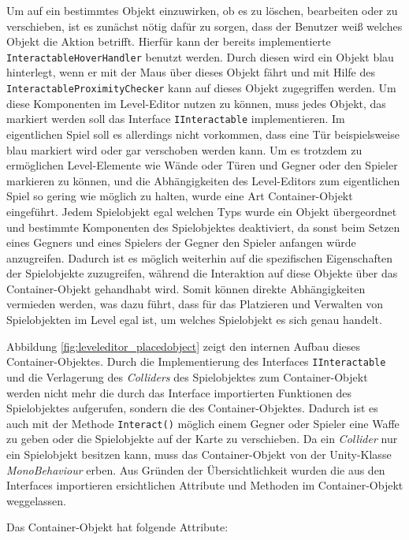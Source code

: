 Um auf ein bestimmtes Objekt einzuwirken, ob es zu löschen, bearbeiten oder zu verschieben, ist es zunächst nötig dafür zu sorgen, dass der Benutzer weiß welches Objekt die Aktion betrifft. Hierfür kann der bereits implementierte \texttt{InteractableHoverHandler} benutzt werden. Durch diesen wird ein Objekt blau hinterlegt, wenn er mit der Maus über dieses Objekt fährt und mit Hilfe des \texttt{InteractableProximityChecker} kann auf dieses Objekt zugegriffen werden. Um diese Komponenten im Level-Editor nutzen zu können, muss jedes Objekt, das markiert werden soll das Interface \texttt{IInteractable} implementieren. Im eigentlichen Spiel soll es allerdings nicht vorkommen, dass eine Tür beispielsweise blau markiert wird oder gar verschoben werden kann. Um es trotzdem zu ermöglichen Level-Elemente wie Wände oder Türen und Gegner oder den Spieler markieren zu können, und die Abhängigkeiten des Level-Editors zum eigentlichen Spiel so gering wie möglich zu halten, wurde eine Art Container-Objekt eingeführt. Jedem Spielobjekt egal welchen Typs wurde ein Objekt übergeordnet und bestimmte Komponenten des Spielobjektes deaktiviert, da sonst beim Setzen eines Gegners und eines Spielers der Gegner den Spieler anfangen würde anzugreifen. Dadurch ist es möglich weiterhin auf die spezifischen Eigenschaften der Spielobjekte zuzugreifen, während die Interaktion auf diese Objekte über das Container-Objekt gehandhabt wird. Somit können direkte Abhängigkeiten vermieden werden, was dazu führt, dass für das Platzieren und Verwalten von Spielobjekten im Level egal ist, um welches Spielobjekt es sich genau handelt. 

Abbildung \ref{fig:leveleditor_placedobject} zeigt den internen Aufbau dieses Container-Objektes. Durch die Implementierung des Interfaces \texttt{IInteractable} und die Verlagerung des \textit{Colliders} des Spielobjektes zum Container-Objekt werden nicht mehr die durch das Interface importierten Funktionen des Spielobjektes aufgerufen, sondern die des Container-Objektes. Dadurch ist es auch mit der Methode \texttt{Interact()} möglich einem Gegner oder Spieler eine Waffe zu geben oder die Spielobjekte auf der Karte zu verschieben. Da ein \textit{Collider} nur ein Spielobjekt besitzen kann, muss das Container-Objekt von der Unity-Klasse \textit{MonoBehaviour} erben. Aus Gründen der Übersichtlichkeit wurden die aus den Interfaces importieren ersichtlichen Attribute und Methoden im Container-Objekt weggelassen. 

Das Container-Objekt hat folgende Attribute:

